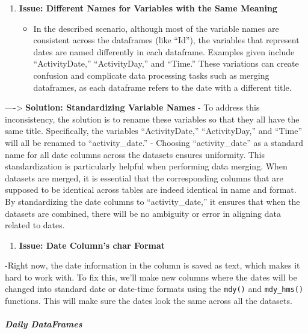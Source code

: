 \documentclass[
]{article}
\providecommand{\tightlist}{%
  \setlength{\itemsep}{0pt}\setlength{\parskip}{0pt}}
\begin{document}
\begin{enumerate}
\def\labelenumi{\arabic{enumi}.}
\setcounter{enumi}{1}
\tightlist
\item
  \textbf{Issue: Different Names for Variables with the Same Meaning}

  \begin{itemize}
  \tightlist
  \item
    In the described scenario, although most of the variable names are
    consistent across the dataframes (like ``Id''), the variables that
    represent dates are named differently in each dataframe. Examples
    given include ``ActivityDate,'' ``ActivityDay,'' and ``Time.'' These
    variations can create confusion and complicate data processing tasks
    such as merging dataframes, as each dataframe refers to the date
    with a different title.
  \end{itemize}
\end{enumerate}

----\textgreater{} \textbf{Solution: Standardizing Variable Names} - To
address this inconsistency, the solution is to rename these variables so
that they all have the same title. Specifically, the variables
``ActivityDate,'' ``ActivityDay,'' and ``Time'' will all be renamed to
``activity\_date.'' - Choosing ``activity\_date'' as a standard name for
all date columns across the datasets ensures uniformity. This
standardization is particularly helpful when performing data merging.
When datasets are merged, it is essential that the corresponding columns
that are supposed to be identical across tables are indeed identical in
name and format. By standardizing the date columns to
``activity\_date,'' it ensures that when the datasets are combined,
there will be no ambiguity or error in aligning data related to dates.

\begin{enumerate}
\def\labelenumi{\arabic{enumi}.}
\setcounter{enumi}{2}
\tightlist
\item
  \textbf{Issue: Date Column's char Format}
\end{enumerate}

-Right now, the date information in the column is saved as text, which
makes it hard to work with. To fix this, we'll make new columns where
the dates will be changed into standard date or date-time formats using
the \texttt{mdy()} and \texttt{mdy\_hms()} functions. This will make
sure the dates look the same across all the datasets.

\hypertarget{daily-dataframes-1}{%
\subparagraph{Daily DataFrames}\label{daily-dataframes-1}}
\end{document}
